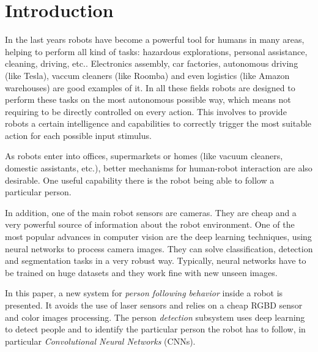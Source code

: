 \section{Introduction}

In the last years robots have become a powerful tool for humans in many areas, helping to perform all kind of tasks: hazardous explorations, personal assistance, cleaning, driving, etc.. Electronics assembly, car factories, autonomous driving (like Tesla), vaccum cleaners (like Roomba) and even logistics (like Amazon warehouses) are good examples of it. In all these fields robots are designed to perform these tasks on the most autonomous possible way, which means not requiring to be directly controlled on every action. This involves to provide robots a certain intelligence and capabilities to correctly trigger the most suitable action for each possible input stimulus. 

As robots enter into offices, supermarkets or homes (like vacuum cleaners, domestic assistants, etc.), better mechanisms for human-robot interaction are also desirable. One useful capability there is the robot being able to follow a particular person. 

In addition, one of the main robot sensors are cameras. They are cheap and a very powerful source of information about the robot environment. One of the most popular advances in computer vision are the deep learning techniques, using neural networks to process camera images. They can solve classification, detection and segmentation tasks in a very robust way. Typically, neural networks have to be trained on huge datasets and they work fine with new unseen images. 


In this paper, a new system for \emph{person following behavior} inside a robot is presented. It avoids the use of laser sensors and relies on a cheap RGBD sensor and color images processing. The person \emph{detection} subsystem uses deep learning to detect people and to identify the particular person the robot has to follow, in particular \emph{Convolutional Neural Networks} (CNNs).




